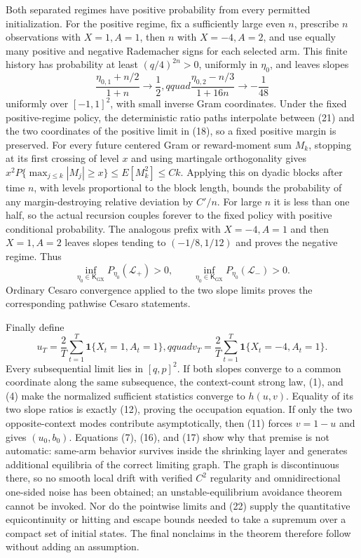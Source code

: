 Both separated regimes have positive probability from every permitted initialization. For the positive regime, fix a sufficiently large even \(n\), prescribe \(n\) observations with \(X=1,A=1\), then \(n\) with \(X=-4,A=2\), and use equally many positive and negative Rademacher signs for each selected arm. This finite history has probability at least \((q/4)^{2n}>0\), uniformly in \(\eta_0\), and leaves slopes
\[
 \frac{\eta_{0,1}+n/2}{1+n}\longrightarrow\frac12,qquad
 \frac{\eta_{0,2}-n/3}{1+16n}\longrightarrow-\frac1{48} \tag{21}
\]
uniformly over \([-1,1]^2\), with small inverse Gram coordinates. Under the fixed positive-regime policy, the deterministic ratio paths interpolate between (21) and the two coordinates of the positive limit in (18), so a fixed positive margin is preserved. For every future centered Gram or reward-moment sum \(M_k\), stopping at its first crossing of level \(x\) and using martingale orthogonality gives \(x^2P\{\max_{j\le k}|M_j|\ge x\}\le E[M_k^2]\le Ck\). Applying this on dyadic blocks after time \(n\), with levels proportional to the block length, bounds the probability of any margin-destroying relative deviation by \(C'/n\). For large \(n\) it is less than one half, so the actual recursion couples forever to the fixed policy with positive conditional probability. The analogous prefix with \(X=-4,A=1\) and then \(X=1,A=2\) leaves slopes tending to \((-1/8,1/12)\) and proves the negative regime. Thus
\[
 \inf_{\eta_0\in\mathsf K_{\mathrm{GX}}}P_{\eta_0}(\mathcal L_+)>0,
 \qquad
 \inf_{\eta_0\in\mathsf K_{\mathrm{GX}}}P_{\eta_0}(\mathcal L_-)>0. \tag{22}
\]
Ordinary Cesaro convergence applied to the two slope limits proves the corresponding pathwise Cesaro statements.

Finally define
\[
 u_T=\frac2T\sum_{t=1}^T\mathbf 1\{X_t=1,A_t=1\},qquad
 v_T=\frac2T\sum_{t=1}^T\mathbf 1\{X_t=-4,A_t=1\}.
\]
Every subsequential limit lies in \([q,p]^2\). If both slopes converge to a common coordinate along the same subsequence, the context-count strong law, (1), and (4) make the normalized sufficient statistics converge to \(h(u,v)\). Equality of its two slope ratios is exactly (12), proving the occupation equation. If only the two opposite-context modes contribute asymptotically, then (11) forces \(v=1-u\) and gives \((u_0,b_0)\). Equations (7), (16), and (17) show why that premise is not automatic: same-arm behavior survives inside the shrinking layer and generates additional equilibria of the correct limiting graph. The graph is discontinuous there, so no smooth local drift with verified \(C^2\) regularity and omnidirectional one-sided noise has been obtained; an unstable-equilibrium avoidance theorem cannot be invoked. Nor do the pointwise limits and (22) supply the quantitative equicontinuity or hitting and escape bounds needed to take a supremum over a compact set of initial states. The final nonclaims in the theorem therefore follow without adding an assumption.